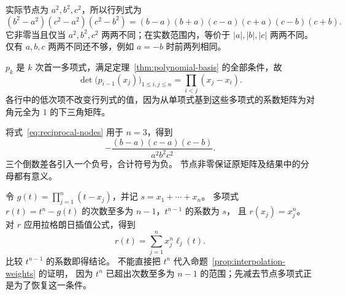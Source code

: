 \documentclass[UTF8,12pt,a4paper,fontset=fandol]{ctexart}
\begin{document}
\begin{solve}
实际节点为 $a^2,b^2,c^2$，所以行列式为
\[
  (b^2-a^2)(c^2-a^2)(c^2-b^2)
  =(b-a)(b+a)(c-a)(c+a)(c-b)(c+b).
\]
它非零当且仅当 $a^2,b^2,c^2$ 两两不同；在实数范围内，等价于
$|a|,|b|,|c|$ 两两不同。
仅有 $a,b,c$ 两两不同还不够，例如 $a=-b$ 时前两列相同。
\end{solve}

\begin{solve}
$p_k$ 是 $k$ 次首一多项式，满足定理~\ref{thm:polynomial-basis} 的全部条件，故
\[
  \det\bigl(p_{i-1}(x_j)\bigr)_{1\leq i,j\leq n}
  =\prod_{i<j}(x_j-x_i).
\]
各行中的低次项不改变行列式的值，因为从单项式基到这些多项式的系数矩阵为对角元全为 $1$ 的下三角矩阵。
\end{solve}

\begin{solve}
将式~\eqref{eq:reciprocal-nodes} 用于 $n=3$，得到
\[
  -\frac{(b-a)(c-a)(c-b)}{a^2b^2c^2}.
\]
三个倒数差各引入一个负号，合计符号为负。
节点非零保证原矩阵及结果中的分母都有意义。
\end{solve}

\begin{solve}
令 $g(t)=\prod_{j=1}^n(t-x_j)$，并记 $s=x_1+\cdots+x_n$。
多项式 $r(t)=t^n-g(t)$ 的次数至多为 $n-1$，$t^{n-1}$ 的系数为 $s$，
且 $r(x_j)=x_j^n$。
对 $r$ 应用拉格朗日插值公式，得到
\[
  r(t)=\sum_{j=1}^n x_j^n\ell_j(t).
\]
比较 $t^{n-1}$ 的系数即得结论。
不能直接把 $t^n$ 代入命题~\ref{prop:interpolation-weights} 的证明，
因为 $t^n$ 已超出次数至多为 $n-1$ 的范围；先减去节点多项式正是为了恢复这一条件。
\end{solve}
\end{document}
